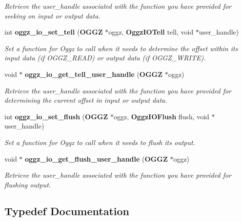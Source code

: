 \begin{CompactItemize}
\begin{CompactList}\small\item\em Retrieve the user\_\-handle associated with the function you have provided for seeking on input or output data. \item\end{CompactList}\item 
int {\bf oggz\_\-io\_\-set\_\-tell} ({\bf OGGZ} $\ast$oggz, {\bf Oggz\-IOTell} tell, void $\ast$user\_\-handle)
\begin{CompactList}\small\item\em Set a function for Oggz to call when it needs to determine the offset within its input data (if OGGZ\_\-READ) or output data (if OGGZ\_\-WRITE). \item\end{CompactList}\item 
void $\ast$ {\bf oggz\_\-io\_\-get\_\-tell\_\-user\_\-handle} ({\bf OGGZ} $\ast$oggz)
\begin{CompactList}\small\item\em Retrieve the user\_\-handle associated with the function you have provided for determining the current offset in input or output data. \item\end{CompactList}\item 
int {\bf oggz\_\-io\_\-set\_\-flush} ({\bf OGGZ} $\ast$oggz, {\bf Oggz\-IOFlush} flush, void $\ast$user\_\-handle)
\begin{CompactList}\small\item\em Set a function for Oggz to call when it needs to flush its output. \item\end{CompactList}\item 
void $\ast$ {\bf oggz\_\-io\_\-get\_\-flush\_\-user\_\-handle} ({\bf OGGZ} $\ast$oggz)
\begin{CompactList}\small\item\em Retrieve the user\_\-handle associated with the function you have provided for flushing output. \item\end{CompactList}\end{CompactItemize}


\subsection{Typedef Documentation}
